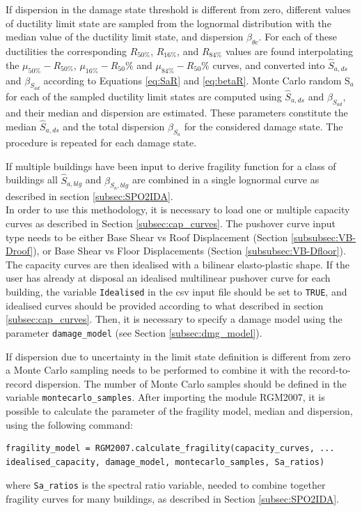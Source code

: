 If dispersion in the damage state threshold is different from zero, different values of ductility limit state are sampled from the lognormal distribution with the median value of the ductility limit state, and dispersion $\beta_{\theta c}$. For each of these ductilities the corresponding $R_{50\%}$, $R_{16\%}$, and $R_{84\%}$ values are found interpolating the $\mu_{50\%}-R_{50\%}$, $\mu_{16\%}-R_50\%$ and $\mu_{84\%}-R_50\%$ curves, and converted into $\hat{S}_{a,ds}$ and $\beta_{S_{a d}}$ according to Equations \ref{eq:SaR} and \ref{eq:betaR}. Monte Carlo random S$_a$ for each of the sampled ductility limit states are computed using $\hat{S}_{a,ds}$ and $\beta_{S_{a d}}$, and their median and dispersion are estimated. These parameters constitute the median $\hat{S}_{a,ds}$ and the total dispersion $\beta_{S_a}$ for the considered damage state. The procedure is repeated for each damage state.

If multiple buildings have been input to derive fragility function for a class of buildings all $\hat{S}_{a, blg}$ and $\beta_{S_a, blg}$ are combined in a single lognormal curve as described in section \ref{subsec:SPO2IDA}.\\

In order to use this methodology, it is necessary to load one or multiple capacity curves as described in Section \ref{subsec:cap_curves}. The pushover curve input type needs to be either Base Shear vs Roof Displacement (Section \ref{subsubsec:VB-Droof}), or Base Shear vs Floor Displacements (Section \ref{subsubsec:VB-Dfloor}). The capacity curves are then idealised with a bilinear elasto-plastic shape. If the user has already at disposal an idealised multilinear pushover curve for each building, the variable \verb=Idealised= in the csv input file should be set to \verb=TRUE=, and idealised curves should be provided according to what described in section \ref{subsec:cap_curves}. Then, it is necessary to specify a damage model using the parameter \verb=damage_model= (see Section \ref{subsec:dmg_model}).

If dispersion due to uncertainty in the limit state definition is different from zero a Monte Carlo sampling needs to be performed to combine it with the record-to-record dispersion. The number of Monte Carlo samples should be defined in the variable \verb=montecarlo_samples=.
After importing the module RGM2007, it is possible to calculate the parameter of the fragility model, median and dispersion, using the following command:

\begin{Verbatim}[frame=single, commandchars=\\\{\}, samepage=true]
fragility_model = RGM2007.calculate_fragility(capacity_curves, ...
idealised_capacity, damage_model, montecarlo_samples, Sa_ratios)
\end{Verbatim}

where \verb=Sa_ratios= is the spectral ratio variable, needed to combine together fragility curves for many buildings, as described in Section \ref{subsec:SPO2IDA}.